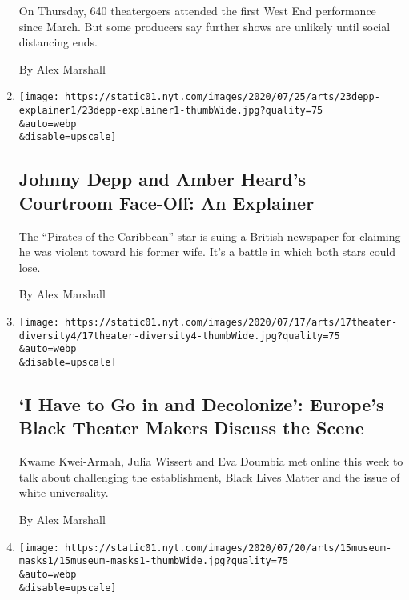 \begin{enumerate}
  On Thursday, 640 theatergoers attended the first West End performance
  since March. But some producers say further shows are unlikely until
  social distancing ends.

  By Alex Marshall
\item
  \href{/2020/07/23/movies/johnny-depp-amber-heard-trial.html}{}

  \texttt{[image: https://static01.nyt.com/images/2020/07/25/arts/23depp-explainer1/23depp-explainer1-thumbWide.jpg?quality=75\\\&auto=webp\\\&disable=upscale]}

  \hypertarget{johnny-depp-and-amber-heards-courtroom-face-off-an-explainer}{%
  \subsection{Johnny Depp and Amber Heard's Courtroom Face-Off: An
  Explainer}\label{johnny-depp-and-amber-heards-courtroom-face-off-an-explainer}}

  The ``Pirates of the Caribbean'' star is suing a British newspaper for
  claiming he was violent toward his former wife. It's a battle in which
  both stars could lose.

  By Alex Marshall
\item
  \href{/2020/07/20/theater/theater-diversity-europe.html}{}

  \texttt{[image: https://static01.nyt.com/images/2020/07/17/arts/17theater-diversity4/17theater-diversity4-thumbWide.jpg?quality=75\\\&auto=webp\\\&disable=upscale]}

  \hypertarget{i-have-to-go-in-and-decolonize-europes-black-theater-makers-discuss-the-scene}{%
  \subsection{`I Have to Go in and Decolonize': Europe's Black Theater
  Makers Discuss the
  Scene}\label{i-have-to-go-in-and-decolonize-europes-black-theater-makers-discuss-the-scene}}

  Kwame Kwei-Armah, Julia Wissert and Eva Doumbia met online this week
  to talk about challenging the establishment, Black Lives Matter and
  the issue of white universality.

  By Alex Marshall
\item
  \href{/2020/07/16/arts/design/museums-masks.html}{}

  \texttt{[image: https://static01.nyt.com/images/2020/07/20/arts/15museum-masks1/15museum-masks1-thumbWide.jpg?quality=75\\\&auto=webp\\\&disable=upscale]}


\end{enumerate}
